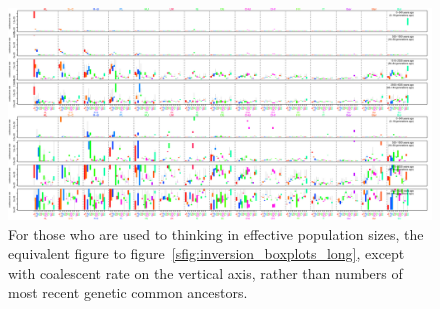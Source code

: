 \documentclass{article}
\begin{document}
\begin{figure}[!htp]
  \begin{center}
    
    \vspace{2em}
    \begin{center}
      \includegraphics[angle=90,height=.9\textheight]{inversion-boxplots-long-coal}
    \end{center}
    \vspace{2em}
    \caption{
    For those who are used to thinking in effective population sizes,
    the equivalent figure to figure~\ref{sfig:inversion_boxplots_long},
    except with coalescent rate on the vertical axis, 
    rather than numbers of most recent genetic common ancestors.
    \label{sfig:inversion_boxplots_long_coal}
    }
  \end{center}
\end{figure}
\end{document}
